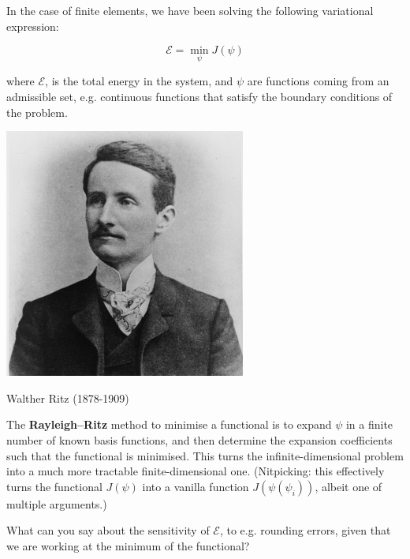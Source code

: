 In the case of finite elements, we have been solving the following variational expression:

\begin{equation}
\mathcal{E} = \min_\psi J(\psi)
\end{equation} 

where $\mathcal{E}$, is the total energy in the system, and $\psi$ are functions coming from an admissible set, e.g. continuous functions that satisfy the boundary conditions of the problem.

\begin{marginfigure}[-1.5cm]
  \includegraphics{numeric/figures/w_ritz}
  \caption{Walther Ritz (1878-1909)}
\end{marginfigure}

The \textbf{Rayleigh--Ritz} method to minimise a functional is to expand $\psi$ in a finite number of known basis functions, and then determine the expansion coefficients such that the functional is minimised. This turns the infinite-dimensional problem into a much more tractable finite-dimensional one. (Nitpicking: this effectively turns the functional $J(\psi)$ into a vanilla function $J(\psi(\psi_i))$, albeit one of multiple arguments.)

\begin{cue}
What can you say about the sensitivity of $\mathcal{E}$, to e.g. rounding errors, given that we are working at the minimum of the functional? 
\end{cue}

